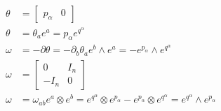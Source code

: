 \documentclass[11pt]{article}
\begin{document}
\begin{equation}
\begin{aligned}
\theta &= \left[ \begin{matrix}
p_\alpha & 0 \end{matrix} \right] \\
\theta &= \theta_a e^a = p_\alpha e^{q^\alpha} \\
\omega &= - \partial \theta = - \partial_b \theta_a e^b \wedge e^a = - e^{p_\alpha} \wedge e^{q^\alpha}  \\
\omega &= \left[ \begin{matrix}
0 & I_n \\[2.2ex]
- I_n & 0 \end{matrix} \right] \\
\omega &= \omega_{ab} e^a \otimes e^b = e^{q^\alpha} \otimes e^{p_\alpha} - e^{p_\alpha} \otimes e^{q^\alpha} = e^{q^\alpha} \wedge e^{p_\alpha} \\
\end{aligned}
\end{equation}
\end{document}
